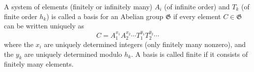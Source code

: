 A system of elements (finitely or infinitely many) $A_i$ (of infinite order) and $T_k$ (of finite order $h_k$) is called a basis for an Abelian group $\mathfrak{G}$ if every element $C \in \mathfrak{G}$ can be written uniquely as
$$C = A_1^{x_1} A_2^{x_2} \cdots T_1^{y_1} T_2^{y_2} \cdots$$
where the $x_i$ are uniquely determined integers (only finitely many nonzero), and the $y_k$ are uniquely determined modulo $h_k$. A basis is called finite if it consists of finitely many elements.
